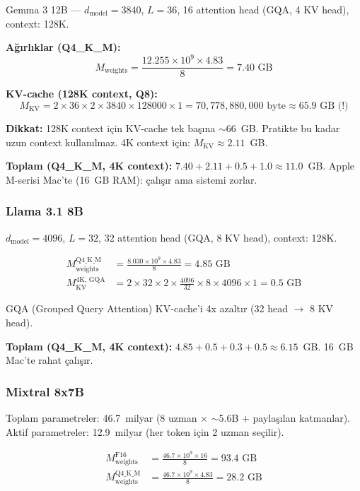 \begin{ornek}
Gemma 3 12B --- $d_{\text{model}} = 3840$, $L = 36$, 16 attention head (GQA, 4 KV head), context: 128K.

\textbf{A\u{g}{\i}rl{\i}klar (Q4\_K\_M):}
\[
M_{\text{weights}} = \frac{12.255 \times 10^9 \times 4.83}{8} = 7.40 \text{ GB}
\]

\textbf{KV-cache (128K context, Q8):}
\[
M_{\text{KV}} = 2 \times 36 \times 2 \times 3840 \times 128000 \times 1 = 70{,}778{,}880{,}000 \text{ byte} \approx 65.9 \text{ GB (!)}
\]

\textbf{Dikkat:} 128K context i\c{c}in KV-cache tek ba\c{s}{\i}na $\sim$66~GB. Pratikte bu kadar uzun context kullan{\i}lmaz. 4K context i\c{c}in: $M_{\text{KV}} \approx 2.11$~GB.

\textbf{Toplam (Q4\_K\_M, 4K context):} $7.40 + 2.11 + 0.5 + 1.0 \approx 11.0$~GB. Apple M-serisi Mac'te (16~GB RAM): \c{c}al{\i}\c{s}{\i}r ama sistemi zorlar.
\end{ornek}

\subsubsection{Llama 3.1 8B}

$d_{\text{model}} = 4096$, $L = 32$, 32 attention head (GQA, 8 KV head), context: 128K.

\begin{align*}
M_{\text{weights}}^{\text{Q4\_K\_M}} &= \frac{8.030 \times 10^9 \times 4.83}{8} = 4.85 \text{ GB} \\
M_{\text{KV}}^{\text{4K, GQA}} &= 2 \times 32 \times 2 \times \frac{4096}{32} \times 8 \times 4096 \times 1 = 0.5 \text{ GB}
\end{align*}

GQA (Grouped Query Attention) KV-cache'i 4x azalt{\i}r (32 head $\to$ 8 KV head).

\textbf{Toplam (Q4\_K\_M, 4K context):} $4.85 + 0.5 + 0.3 + 0.5 \approx 6.15$~GB. 16~GB Mac'te rahat \c{c}al{\i}\c{s}{\i}r.

\subsubsection{Mixtral 8x7B}

Toplam parametreler: 46.7~milyar (8 uzman $\times$ $\sim$5.6B + payla\c{s}{\i}lan katmanlar). Aktif parametreler: 12.9~milyar (her token i\c{c}in 2 uzman se\c{c}ilir).

\begin{align*}
M_{\text{weights}}^{\text{F16}} &= \frac{46.7 \times 10^9 \times 16}{8} = 93.4 \text{ GB} \\
M_{\text{weights}}^{\text{Q4\_K\_M}} &= \frac{46.7 \times 10^9 \times 4.83}{8} = 28.2 \text{ GB}
\end{align*}

